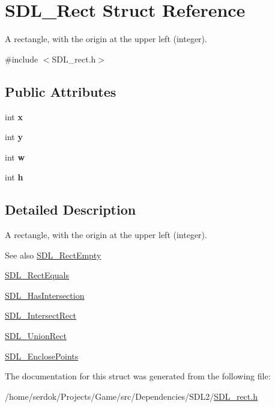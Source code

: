 \hypertarget{structSDL__Rect}{}\section{S\+D\+L\+\_\+\+Rect Struct Reference}
\label{structSDL__Rect}


A rectangle, with the origin at the upper left (integer).  




{\ttfamily \#include $<$S\+D\+L\+\_\+rect.\+h$>$}

\subsection*{Public Attributes}
\begin{DoxyCompactItemize}
\item 
\mbox{\label{structSDL__Rect_a85418d94621dd6855805c4b5c7bf6482}} 
int {\bfseries x}
\item 
\mbox{\label{structSDL__Rect_a822694af8ddca5fd0d5d94e47106ab85}} 
int {\bfseries y}
\item 
\mbox{\label{structSDL__Rect_a56b7be5738fb6fab86881534a814c45e}} 
int {\bfseries w}
\item 
\mbox{\label{structSDL__Rect_a0a17d46b320af8063b746153348edd72}} 
int {\bfseries h}
\end{DoxyCompactItemize}


\subsection{Detailed Description}
A rectangle, with the origin at the upper left (integer). 

\begin{DoxySeeAlso}{See also}
\hyperlink{SDL__rect_8h_aac0e9b5d3f34baec6a2cde95bb01f49c}{S\+D\+L\+\_\+\+Rect\+Empty} 

\hyperlink{SDL__rect_8h_a156979fd3561cf90b87741d11057262a}{S\+D\+L\+\_\+\+Rect\+Equals} 

\hyperlink{SDL__rect_8h_a191ec0b069421d4a36304b475697e847}{S\+D\+L\+\_\+\+Has\+Intersection} 

\hyperlink{SDL__rect_8h_aff8e3dd3b1a25443cd7c8cf02a087290}{S\+D\+L\+\_\+\+Intersect\+Rect} 

\hyperlink{SDL__rect_8h_a659f2c25335202888408c95195823f9c}{S\+D\+L\+\_\+\+Union\+Rect} 

\hyperlink{SDL__rect_8h_afcbb58dbba760b9e6fdb4b5d1ece015c}{S\+D\+L\+\_\+\+Enclose\+Points} 
\end{DoxySeeAlso}


The documentation for this struct was generated from the following file\+:\begin{DoxyCompactItemize}
\item 
/home/serdok/\+Projects/\+Game/src/\+Dependencies/\+S\+D\+L2/\hyperlink{SDL__rect_8h}{S\+D\+L\+\_\+rect.\+h}\end{DoxyCompactItemize}
